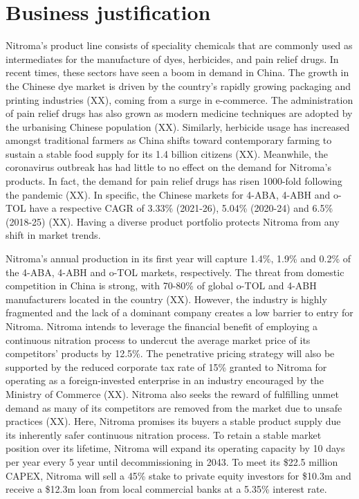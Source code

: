 \section*{Business justification}


Nitroma’s product line consists of speciality chemicals that are commonly used as intermediates for the manufacture of dyes, herbicides, and pain relief drugs. In recent times, these sectors have seen a boom in demand in China. The growth in the Chinese dye market is driven by the country’s rapidly growing packaging and printing industries (XX), coming from a surge in e-commerce. The administration of pain relief drugs has also grown as modern medicine techniques are adopted by the urbanising Chinese population (XX). Similarly, herbicide usage has increased amongst traditional farmers as China shifts toward contemporary farming to sustain a stable food supply for its 1.4 billion citizens (XX). Meanwhile, the coronavirus outbreak has had little to no effect on the demand for Nitroma’s products. In fact, the demand for pain relief drugs has risen 1000-fold following the pandemic (XX). In specific, the Chinese markets for 4-ABA, 4-ABH and o-TOL have a respective CAGR of 3.33\% (2021-26), 5.04\% (2020-24) and 6.5\% (2018-25) (XX). Having a diverse product portfolio protects Nitroma from any shift in market trends.

Nitroma’s annual production in its first year will capture 1.4\%, 1.9\% and 0.2\% of the 4-ABA, 4-ABH and o-TOL markets, respectively. The threat from domestic competition in China is strong, with 70-80\% of global o-TOL and 4-ABH manufacturers located in the country (XX). However, the industry is highly fragmented and the lack of a dominant company creates a low barrier to entry for Nitroma. Nitroma intends to leverage the financial benefit of employing a continuous nitration process to undercut the average market price of its competitors’ products by 12.5\%.  The penetrative pricing strategy will also be supported by the reduced corporate tax rate of 15\% granted to Nitroma for operating as a foreign-invested enterprise in an industry encouraged by the Ministry of Commerce (XX). Nitroma also seeks the reward of fulfilling unmet demand as many of its competitors are removed from the market due to unsafe practices (XX). Here, Nitroma promises its buyers a stable product supply due its inherently safer continuous nitration process. To retain a stable market position over its lifetime, Nitroma will expand its operating capacity by 10 days per year every 5 year until decommissioning in 2043. To meet its \$22.5 million CAPEX, Nitroma will sell a 45\% stake to private equity investors for \$10.3m and receive a \$12.3m loan from local commercial banks at a 5.35\% interest rate.


